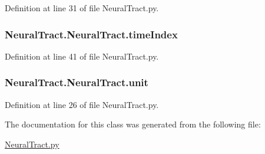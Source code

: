 Definition at line 31 of file Neural\-Tract.\-py.

\hypertarget{class_neural_tract_1_1_neural_tract_adcda2b95aa86d4e7eebcc2557aee58cf}{
\subsubsection[{time\-Index}]{\setlength{\rightskip}{0pt plus 5cm}Neural\-Tract.\-Neural\-Tract.\-time\-Index}}\label{class_neural_tract_1_1_neural_tract_adcda2b95aa86d4e7eebcc2557aee58cf}


Definition at line 41 of file Neural\-Tract.\-py.

\hypertarget{class_neural_tract_1_1_neural_tract_a95db7d0720ec12f091758968476ba240}{
\subsubsection[{unit}]{\setlength{\rightskip}{0pt plus 5cm}Neural\-Tract.\-Neural\-Tract.\-unit}}\label{class_neural_tract_1_1_neural_tract_a95db7d0720ec12f091758968476ba240}


Definition at line 26 of file Neural\-Tract.\-py.



The documentation for this class was generated from the following file\-:\begin{DoxyCompactItemize}
\item 
\hyperlink{_neural_tract_8py}{Neural\-Tract.\-py}\end{DoxyCompactItemize}
